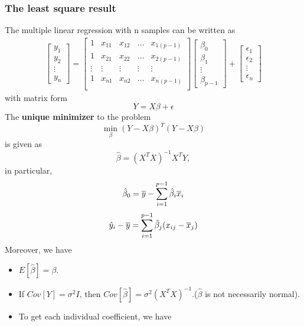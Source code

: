 \begin{refsection}
\subsubsection{The least square result}
\begin{theorem}\label{ch:statistical-models:th:leastSquareSolution}\label{ch:statistical-models:th:OrdinaryLinearRegressionleastSquareSolution}
	The multiple linear regression with n samples can be written as
	\begin{align*}
	\begin{bmatrix}
	y_1\\
	y_2\\
	\vdots\\
	y_n
	\end{bmatrix} = \begin{bmatrix}
	1 & x_{11} & x_{12} & \dots & x_{1(p-1)}\\
	1 & x_{21} & x_{22} & \dots & x_{2(p-1)}\\
	\vdots & \vdots & \vdots & \vdots & \vdots \\
	1 & x_{n1} & x_{n2} & \dots & x_{n(p-1)}\\
	\end{bmatrix}
	\begin{bmatrix}
	\beta_0\\
	\beta_1\\
	\vdots\\
	\beta_{p-1}
	\end{bmatrix}
	+ \begin{bmatrix}
	\epsilon_1\\
	\epsilon_2\\
	\vdots\\
	\epsilon_{n}
	\end{bmatrix}
	\end{align*}
	with matrix form
	$$Y = X\beta + \epsilon$$
	The \textbf{unique minimizer} to the problem 
	$$\min_\beta (Y-X\beta)^T(Y - X\beta)$$
	is given as
	$$\hat{\beta} = (X^TX)^{-1}X^TY,$$
	in particular, $$\hat{\beta}_0 = \overline{y} - \sum_{i=1}^{p-1} \hat{\beta}_i \overline{x}_i$$
	$$\hat{y}_i - \overline{y} =\sum_{i=1}^{p-1} \hat{\beta}_j (x_{ij}-\overline{x}_j) $$
	Moreover, we have
	\begin{itemize}
		\item $E[\hat{\beta}] = \beta$.
		\item If $Cov[Y] = \sigma^2I$, then $Cov[\hat{\beta}] = \sigma^2(X^TX)^{-1}$.($\hat{\beta}$ is not necessarily normal).
		\item To get each individual coefficient, we have 

\end{itemize}
\end{theorem}
\end{refsection}
